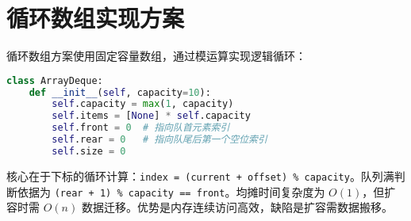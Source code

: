 \section{循环数组实现方案}
循环数组方案使用固定容量数组，通过模运算实现逻辑循环：\par
\begin{lstlisting}[language=python]
class ArrayDeque:
    def __init__(self, capacity=10):
        self.capacity = max(1, capacity)
        self.items = [None] * self.capacity
        self.front = 0  # 指向队首元素索引
        self.rear = 0   # 指向队尾后第一个空位索引
        self.size = 0
\end{lstlisting}
核心在于下标的循环计算：\texttt{index = (current + offset) \%{} capacity}。队列满判断依据为 \texttt{(rear + 1) \%{} capacity == front}。均摊时间复杂度为 $O(1)$，但扩容时需 $O(n)$ 数据迁移。优势是内存连续访问高效，缺陷是扩容需数据搬移。\par
